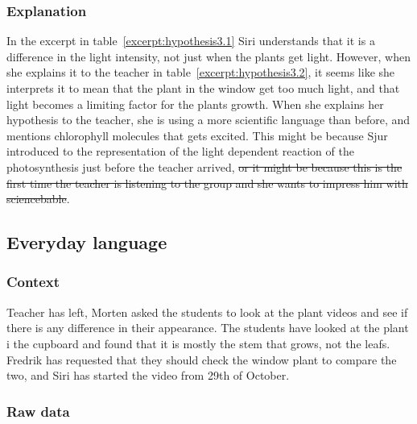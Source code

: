 \subsubsection*{Explanation}
In the excerpt in table~\ref{excerpt:hypothesis3.1} Siri understands that it is a difference in the light intensity, not just when the plants get light. However, when she explains it to the teacher in table~\ref{excerpt:hypothesis3.2}, it seems like she interprets it to mean that the plant in the window get too much light, and that light becomes a limiting factor for the plants growth. When she explains her hypothesis to the teacher, she is using a more scientific language than before, and mentions chlorophyll molecules that gets excited. This might be because Sjur introduced to the representation of the light dependent reaction of the photosynthesis just before the teacher arrived, \sout{or it might be because this is the first time the teacher is listening to the group and she wants to impress him with sciencebable}.


\subsection{Everyday language}


\subsubsection*{Context}
Teacher has left, Morten asked the students to look at the plant videos and see if there is any difference in their appearance. The students have looked at the plant i the cupboard and found that it is mostly the stem that grows, not the leafs. Fredrik has requested that they should check the window plant to compare the two, and Siri has started the video from 29th of October.


\subsubsection*{Raw data}

